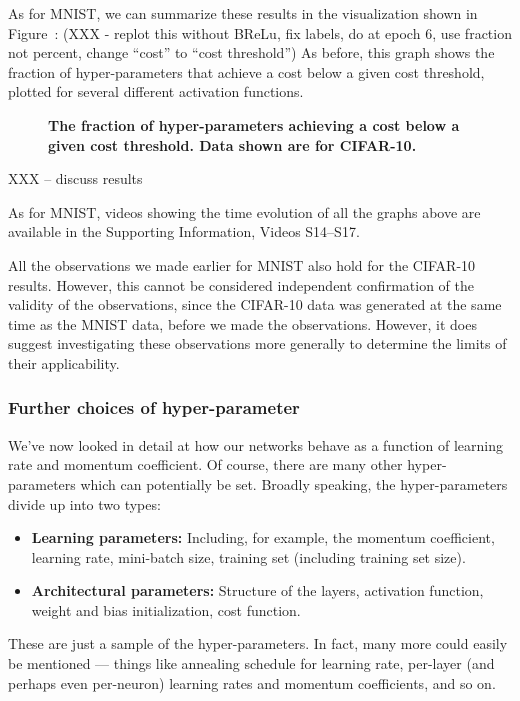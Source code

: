 \documentclass[10pt]{article}
\begin{document}
As for MNIST, we can summarize these results in the visualization
shown in Figure~\label{fig:fraction_CIFAR}: (XXX - replot this without
BReLu, fix labels, do at epoch 6, use fraction not percent, change
``cost'' to ``cost threshold'') As before, this graph shows the
fraction of hyper-parameters that achieve a cost below a given cost
threshold, plotted for several different activation functions.

\begin{figure}[!ht]
\begin{center}
\end{center}
\caption{ {\bf The fraction of hyper-parameters achieving a cost below
    a given cost threshold.  Data shown are for CIFAR-10.}}
\label{fig:fraction_CIFAR}
\end{figure}

XXX -- discuss results

As for MNIST, videos showing the time evolution of all the graphs
above are available in the Supporting Information, Videos S14--S17.

All the observations we made earlier for MNIST also hold for the
CIFAR-10 results.  However, this cannot be considered independent
confirmation of the validity of the observations, since the CIFAR-10
data was generated at the same time as the MNIST data, before we made
the observations.  However, it does suggest investigating these
observations more generally to determine the limits of their
applicability.

\subsubsection*{Further choices of hyper-parameter}

We've now looked in detail at how our networks behave as a function of
learning rate and momentum coefficient.  Of course, there are many
other hyper-parameters which can potentially be set.  Broadly
speaking, the hyper-parameters divide up into two types:
\begin{itemize}
\item \textbf{Learning parameters:} Including, for example, the
  momentum coefficient, learning rate, mini-batch size, training set
  (including training set size).

\item \textbf{Architectural parameters:} Structure of the layers,
  activation function, weight and bias initialization, cost function.
\end{itemize}
These are just a sample of the hyper-parameters.  In fact, many more
could easily be mentioned --- things like annealing schedule for
learning rate, per-layer (and perhaps even per-neuron) learning rates
and momentum coefficients, and so on.
\end{document}
